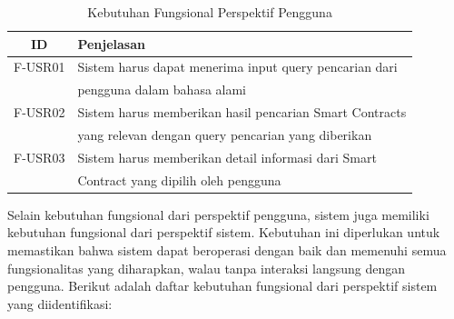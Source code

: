 \begin{table}[ht]
	\caption{Kebutuhan Fungsional Perspektif Pengguna}
	\vspace{0.25cm}
	\begin{center}
		\begin{tabular}{|c|l|}
			\hline
			\textbf{ID} & \textbf{Penjelasan}                                      \\ \hline
			F-USR01     & Sistem harus dapat menerima input query pencarian dari   \\ & pengguna dalam bahasa alami \\ \hline
			F-USR02     & Sistem harus memberikan hasil pencarian Smart Contracts  \\ & yang relevan dengan query pencarian yang diberikan \\ \hline
			F-USR03     & Sistem harus memberikan detail informasi dari Smart      \\ & Contract yang dipilih oleh pengguna \\ \hline
		\end{tabular}
	\end{center}
\end{table}

\break

Selain kebutuhan fungsional dari perspektif pengguna, sistem juga memiliki kebutuhan fungsional dari perspektif sistem. Kebutuhan ini diperlukan untuk memastikan bahwa sistem dapat beroperasi dengan baik dan memenuhi semua fungsionalitas yang diharapkan, walau tanpa interaksi langsung dengan pengguna. Berikut adalah daftar kebutuhan fungsional dari perspektif sistem yang diidentifikasi:

